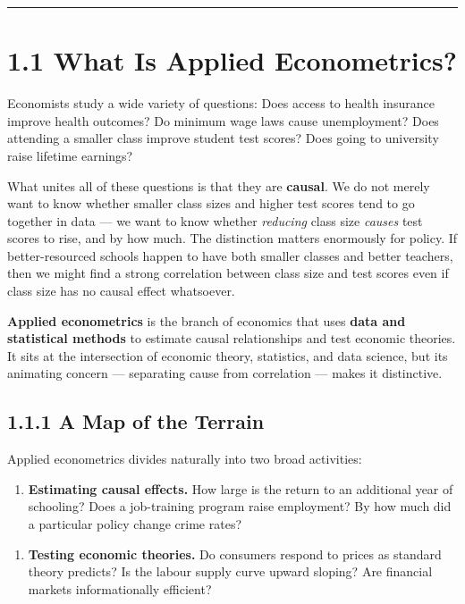 \medskip\hrule\medskip

\section{1.1 What Is Applied Econometrics?}

Economists study a wide variety of questions: Does access to health insurance improve health outcomes? Do minimum wage laws cause unemployment? Does attending a smaller class improve student test scores? Does going to university raise lifetime earnings?

What unites all of these questions is that they are \textbf{causal}. We do not merely want to know whether smaller class sizes and higher test scores tend to go together in data --- we want to know whether \textit{reducing} class size \textit{causes} test scores to rise, and by how much. The distinction matters enormously for policy. If better-resourced schools happen to have both smaller classes and better teachers, then we might find a strong correlation between class size and test scores even if class size has no causal effect whatsoever.

\textbf{Applied econometrics} is the branch of economics that uses \textbf{data and statistical methods} to estimate causal relationships and test economic theories. It sits at the intersection of economic theory, statistics, and data science, but its animating concern --- separating cause from correlation --- makes it distinctive.

\subsection{1.1.1 A Map of the Terrain}

Applied econometrics divides naturally into two broad activities:

\begin{enumerate}
\item \textbf{Estimating causal effects.} How large is the return to an additional year of schooling? Does a job-training program raise employment? By how much did a particular policy change crime rates?
\end{enumerate}

\begin{enumerate}
\item \textbf{Testing economic theories.} Do consumers respond to prices as standard theory predicts? Is the labour supply curve upward sloping? Are financial markets informationally efficient?
\end{enumerate}

